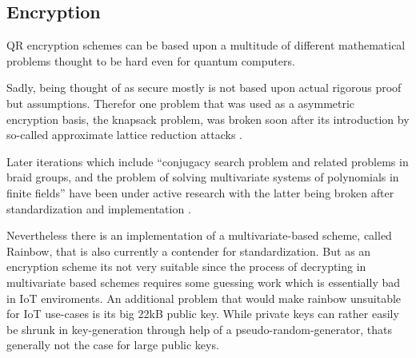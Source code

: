 \documentclass[conference]{IEEEtran}
\newcommand{\comment}[1]{}
\begin{document}
\subsection{Encryption}
\comment{ %
    knapsack problem - broken
    ''
    conjugacy search problem and related problems in braid groups, and the problem of solving
    multivariate systems of polynomials in finite fields
    '' also mostly broken or badly understood \cite{QR_algs}

    lattice based:
    - NTRUEncrypt (compare sigs)
    code based:
    - McEliece Error correction codes transformed - secure and fast (100micros) but keys are k*n matrices : millions of bits \cite{QR_algs} - not feasable 
    multivariate-based: decryption inefficent (''guess work'') \cite{QR_comparison}
    - Rainbow gigantic 22kbyte pubk
    Supersingular EC:
    not much in use and not super researched , one impl (SIKE) \cite{QR_comparison}
    Mixed schemes for backwards comp: neither fully safe nor efficent since 2 schemes need to be saved on device \cite{QR_comparison}

mostly code/lattice based implementations \cite{QR_comparison}
} %
QR encryption schemes can be based upon a multitude of different mathematical problems thought to be hard even for quantum computers.

Sadly, being thought of as secure mostly is not based upon actual rigorous proof but assumptions.
Therefor one problem that was used as a asymmetric encryption basis, the knapsack problem, was broken soon after its introduction by so-called approximate lattice reduction attacks \cite{QR_algs}.

Later iterations which include ``conjugacy search problem and related problems in braid groups, and the problem of solving
multivariate systems of polynomials in finite fields''\cite{QR_algs} have been under active research with the latter being broken after standardization and implementation \cite{QR_algs}.

Nevertheless there is an implementation of a multivariate-based scheme, called Rainbow, that is also currently a contender for standardization. But as an encryption scheme its not very suitable since the process of decrypting in multivariate based schemes requires some guessing work \cite{QR_comparison} which is essentially bad in IoT enviroments.
An additional problem that would make rainbow unsuitable for IoT use-cases is its big 22kB public key. While private keys can rather easily be shrunk in key-generation through help of a pseudo-random-generator, thats generally not the case for large public keys.
\end{document}
